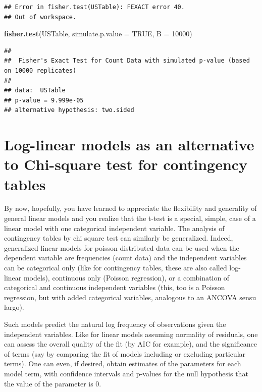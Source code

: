 \documentclass[
  12pt,
]{book}
\newenvironment{Shaded}{\begin{snugshade}}{\end{snugshade}}
\newcommand{\DataTypeTok}[1]{\textcolor[rgb]{0.13,0.29,0.53}{#1}}
\newcommand{\DecValTok}[1]{\textcolor[rgb]{0.00,0.00,0.81}{#1}}
\newcommand{\KeywordTok}[1]{\textcolor[rgb]{0.13,0.29,0.53}{\textbf{#1}}}
\newcommand{\NormalTok}[1]{#1}
\newcommand{\OtherTok}[1]{\textcolor[rgb]{0.56,0.35,0.01}{#1}}
\begin{document}
\begin{verbatim}
## Error in fisher.test(USTable): FEXACT error 40.
## Out of workspace.
\end{verbatim}

\begin{Shaded}
\begin{Highlighting}[]
\KeywordTok{fisher.test}\NormalTok{(USTable, }\DataTypeTok{simulate.p.value =} \OtherTok{TRUE}\NormalTok{, }\DataTypeTok{B =} \DecValTok{10000}\NormalTok{)}
\end{Highlighting}
\end{Shaded}

\begin{verbatim}
## 
##  Fisher's Exact Test for Count Data with simulated p-value (based on 10000 replicates)
## 
## data:  USTable
## p-value = 9.999e-05
## alternative hypothesis: two.sided
\end{verbatim}

\hypertarget{log-linear-models-as-an-alternative-to-chi-square-test-for-contingency-tables}{%
\section{Log-linear models as an alternative to Chi-square test for contingency tables}\label{log-linear-models-as-an-alternative-to-chi-square-test-for-contingency-tables}}

By now, hopefully, you have learned to appreciate the flexibility and generality of general linear models and you realize that the t-test is a special, simple, case of a linear model with one categorical independent variable. The analysis of contingency tables by chi square test can similarly be generalized. Indeed, generalized linear models for poisson distributed data can be used when the dependent variable are frequencies (count data) and the independent variables can be categorical only (like for contingency tables, these are also called log- linear models), continuous only (Poisson regression), or a combination of categorical and continuous independent variables (this, too is a Poisson regression, but with added categorical variables, analogous to an ANCOVA sensu largo).

Such models predict the natural log frequency of observations given the independent variables. Like for linear models assuming normality of residuals, one can assess the overall quality of the fit (by AIC for example), and the significance of terms (say by comparing the fit of models including or excluding particular terms). One can even, if desired, obtain estimates of the parameters for each model term, with confidence intervals and p-values for the null hypothesis that the value of the parameter is 0.
\end{document}

